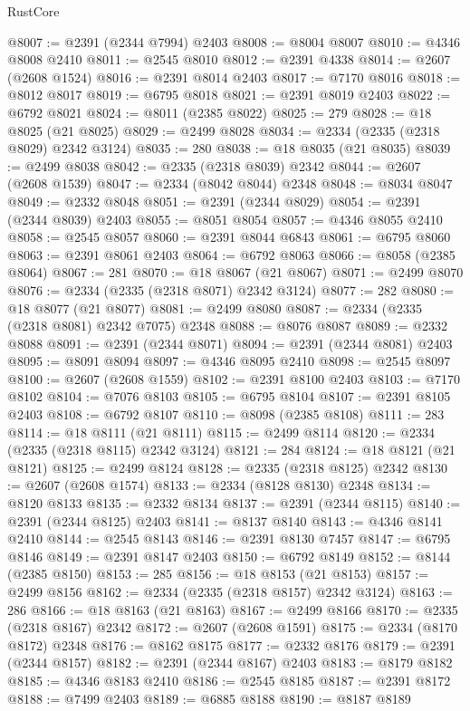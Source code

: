\begin{lexlean}{RustCore}
\begin{coremodule}
@8007 := @2391 (@2344 @7994) @2403
@8008 := @8004 @8007
@8010 := @4346 @8008 @2410
@8011 := @2545 @8010
@8012 := @2391 @4338
@8014 := @2607 (@2608 @1524)
@8016 := @2391 @8014 @2403
@8017 := @7170 @8016
@8018 := @8012 @8017
@8019 := @6795 @8018
@8021 := @2391 @8019 @2403
@8022 := @6792 @8021
@8024 := @8011 (@2385 @8022)
@8025 := 279
@8028 := @18 @8025 (@21 @8025)
@8029 := @2499 @8028
@8034 := @2334 (@2335 (@2318 @8029) @2342 @3124)
@8035 := 280
@8038 := @18 @8035 (@21 @8035)
@8039 := @2499 @8038
@8042 := @2335 (@2318 @8039) @2342
@8044 := @2607 (@2608 @1539)
@8047 := @2334 (@8042 @8044) @2348
@8048 := @8034 @8047
@8049 := @2332 @8048
@8051 := @2391 (@2344 @8029)
@8054 := @2391 (@2344 @8039) @2403
@8055 := @8051 @8054
@8057 := @4346 @8055 @2410
@8058 := @2545 @8057
@8060 := @2391 @8044 @6843
@8061 := @6795 @8060
@8063 := @2391 @8061 @2403
@8064 := @6792 @8063
@8066 := @8058 (@2385 @8064)
@8067 := 281
@8070 := @18 @8067 (@21 @8067)
@8071 := @2499 @8070
@8076 := @2334 (@2335 (@2318 @8071) @2342 @3124)
@8077 := 282
@8080 := @18 @8077 (@21 @8077)
@8081 := @2499 @8080
@8087 := @2334 (@2335 (@2318 @8081) @2342 @7075) @2348
@8088 := @8076 @8087
@8089 := @2332 @8088
@8091 := @2391 (@2344 @8071)
@8094 := @2391 (@2344 @8081) @2403
@8095 := @8091 @8094
@8097 := @4346 @8095 @2410
@8098 := @2545 @8097
@8100 := @2607 (@2608 @1559)
@8102 := @2391 @8100 @2403
@8103 := @7170 @8102
@8104 := @7076 @8103
@8105 := @6795 @8104
@8107 := @2391 @8105 @2403
@8108 := @6792 @8107
@8110 := @8098 (@2385 @8108)
@8111 := 283
@8114 := @18 @8111 (@21 @8111)
@8115 := @2499 @8114
@8120 := @2334 (@2335 (@2318 @8115) @2342 @3124)
@8121 := 284
@8124 := @18 @8121 (@21 @8121)
@8125 := @2499 @8124
@8128 := @2335 (@2318 @8125) @2342
@8130 := @2607 (@2608 @1574)
@8133 := @2334 (@8128 @8130) @2348
@8134 := @8120 @8133
@8135 := @2332 @8134
@8137 := @2391 (@2344 @8115)
@8140 := @2391 (@2344 @8125) @2403
@8141 := @8137 @8140
@8143 := @4346 @8141 @2410
@8144 := @2545 @8143
@8146 := @2391 @8130 @7457
@8147 := @6795 @8146
@8149 := @2391 @8147 @2403
@8150 := @6792 @8149
@8152 := @8144 (@2385 @8150)
@8153 := 285
@8156 := @18 @8153 (@21 @8153)
@8157 := @2499 @8156
@8162 := @2334 (@2335 (@2318 @8157) @2342 @3124)
@8163 := 286
@8166 := @18 @8163 (@21 @8163)
@8167 := @2499 @8166
@8170 := @2335 (@2318 @8167) @2342
@8172 := @2607 (@2608 @1591)
@8175 := @2334 (@8170 @8172) @2348
@8176 := @8162 @8175
@8177 := @2332 @8176
@8179 := @2391 (@2344 @8157)
@8182 := @2391 (@2344 @8167) @2403
@8183 := @8179 @8182
@8185 := @4346 @8183 @2410
@8186 := @2545 @8185
@8187 := @2391 @8172
@8188 := @7499 @2403
@8189 := @6885 @8188
@8190 := @8187 @8189

\end{coremodule}
\end{lexlean}

